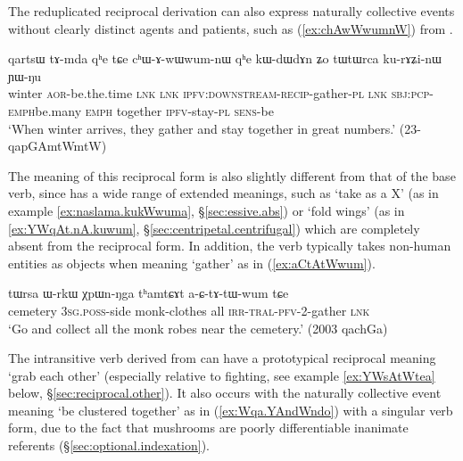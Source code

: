 The reduplicated reciprocal derivation can also express naturally collective events without clearly distinct agents and patients, such as  (\ref{ex:chAwWwumnW}) from .

\begin{exe}
\ex \label{ex:chAwWwumnW}
\gll qartsɯ tɤ-mda qʰe tɕe cʰɯ-ɤ-wɯ\redp{}wum-nɯ qʰe kɯ-dɯ\redp{}dɤn ʑo tɯtɯrca ku-rɤʑi-nɯ ɲɯ-ŋu \\
winter \textsc{aor}-be.the.time \textsc{lnk} \textsc{lnk} \textsc{ipfv}:\textsc{downstream}-\textsc{recip}-gather-\textsc{pl} \textsc{lnk} \textsc{sbj}:\textsc{pcp}-\textsc{emph}\redp{}be.many \textsc{emph} together \textsc{ipfv}-stay-\textsc{pl} \textsc{sens}-be \\
\glt `When winter arrives, they gather and stay together in great numbers.' (23-qapGAmtWmtW) 	
\end{exe}

The meaning of this reciprocal form is also slightly different from that of the base verb, since  has a wide range of extended meanings, such as `take as a X' (as in example \ref{ex:naslama.kukWwuma}, §\ref{sec:essive.abs}) or `fold wings' (as in \ref{ex:YWqAt.nA.kuwum}, §\ref{sec:centripetal.centrifugal}) which are completely absent from the reciprocal form. In addition, the verb   typically takes non-human entities as objects when meaning `gather' as in (\ref{ex:aCtAtWwum}).

\begin{exe}
\ex \label{ex:aCtAtWwum}
\gll tɯrsa ɯ-rkɯ χpɯn-ŋga tʰamtɕɤt a-ɕ-tɤ-tɯ-wum tɕe \\
cemetery \textsc{3sg}.\textsc{poss}-side monk-clothes all \textsc{irr}-\textsc{tral}-\textsc{pfv}-2-gather \textsc{lnk} \\
\glt `Go and collect all the monk robes near the cemetery.' (2003 qachGa)
\end{exe}
 
The intransitive verb  derived from  can have a prototypical reciprocal meaning `grab each other' (especially relative to fighting, see example \ref{ex:YWsAtWtea} below, §\ref{sec:reciprocal.other}). It also occurs with the naturally collective event meaning `be clustered together' as in (\ref{ex:Wqa.YAndWndo}) with a singular verb form, due to the fact that mushrooms are poorly differentiable inanimate referents (§\ref{sec:optional.indexation}).

